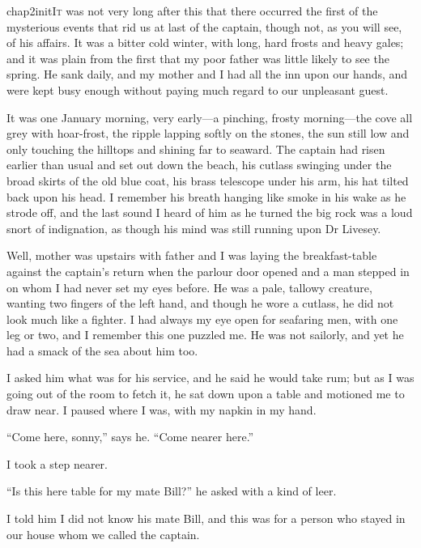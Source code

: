 

 \lettrine[lines=4,image=true]{chap2initI}{t} was not very long after this that there occurred the first of the mysterious events that rid us at last of the captain, though not, as you will see, of his affairs. It was a bitter cold winter, with long, hard frosts and heavy gales; and it was plain from the first that my poor father was little likely to see the spring. He sank daily, and my mother and I had all the inn upon our hands, and were kept busy enough without paying much regard to our unpleasant guest.

It was one January morning, very early---a pinching, frosty morning---the cove all grey with hoar-frost, the ripple lapping softly on the stones, the sun still low and only touching the hilltops and shining far to seaward. The captain had risen earlier than usual and set out down the beach, his cutlass swinging under the broad skirts of the old blue coat, his brass telescope under his arm, his hat tilted back upon his head. I remember his breath hanging like smoke in his wake as he strode off, and the last sound I heard of him as he turned the big rock was a loud snort of indignation, as though his mind was still running upon Dr Livesey.

Well, mother was upstairs with father and I was laying the breakfast-table against the captain’s return when the parlour door opened and a man stepped in on whom I had never set my eyes before. He was a pale, tallowy creature, wanting two fingers of the left hand, and though he wore a cutlass, he did not look much like a fighter. I had always my eye open for seafaring men, with one leg or two, and I remember this one puzzled me. He was not sailorly, and yet he had a smack of the sea about him too.

I asked him what was for his service, and he said he would take rum; but as I was going out of the room to fetch it, he sat down upon a table and motioned me to draw near. I paused where I was, with my napkin in my hand.

\enquote{Come here, sonny,} says he. \enquote{Come nearer here.}

I took a step nearer.

\enquote{Is this here table for my mate Bill?} he asked with a kind of leer.

I told him I did not know his mate Bill, and this was for a person who stayed in our house whom we called the captain.

